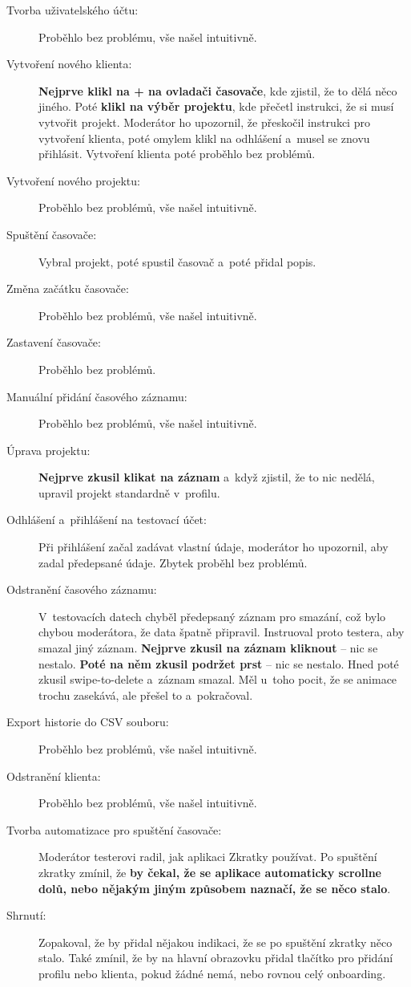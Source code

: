 \begin{description}
\item[Tvorba uživatelského účtu:] Proběhlo bez problému, vše našel intuitivně.
\item[Vytvoření nového klienta:] \textbf{Nejprve klikl na + na ovladači časovače}, kde zjistil, že to dělá něco jiného. Poté \textbf{klikl na výběr projektu}, kde přečetl instrukci, že si musí vytvořit projekt. Moderátor ho upozornil, že přeskočil instrukci pro vytvoření klienta, poté omylem klikl na odhlášení a~musel se znovu přihlásit. Vytvoření klienta poté proběhlo bez problémů.
\item[Vytvoření nového projektu:] Proběhlo bez problémů, vše našel intuitivně.
\item[Spuštění časovače:] Vybral projekt, poté spustil časovač a~poté přidal popis.
\item[Změna začátku časovače:] Proběhlo bez problémů, vše našel intuitivně.
\item[Zastavení časovače:] Proběhlo bez problémů.
\item[Manuální přidání časového záznamu:] Proběhlo bez problémů, vše našel intuitivně.
\item[Úprava projektu:] \textbf{Nejprve zkusil klikat na záznam} a~když zjistil, že to nic nedělá, upravil projekt standardně v~profilu.
\item[Odhlášení a~přihlášení na testovací účet:] Při přihlášení začal zadávat vlastní údaje, moderátor ho upozornil, aby zadal předepsané údaje. Zbytek proběhl bez problémů.
\item[Odstranění časového záznamu:] V~testovacích datech chyběl předepsaný záznam pro smazání, což bylo chybou moderátora, že data špatně připravil. Instruoval proto testera, aby smazal jiný záznam. \textbf{Nejprve zkusil na záznam kliknout} – nic se nestalo. \textbf{Poté na něm zkusil podržet prst} – nic se nestalo. Hned poté zkusil swipe-to-delete a~záznam smazal. Měl u~toho pocit, že se animace trochu zasekává, ale přešel to a~pokračoval.
\item[Export historie do CSV souboru:] Proběhlo bez problémů, vše našel intuitivně.
\item[Odstranění klienta:] Proběhlo bez problémů, vše našel intuitivně.
\item[Tvorba automatizace pro spuštění časovače:] Moderátor testerovi radil, jak aplikaci Zkratky používat. Po spuštění zkratky zmínil, že \textbf{by čekal, že se aplikace automaticky scrollne dolů, nebo nějakým jiným způsobem naznačí, že se něco stalo}.
\item[Shrnutí:] Zopakoval, že by přidal nějakou indikaci, že se po spuštění zkratky něco stalo. Také zmínil, že by na hlavní obrazovku přidal tlačítko pro přidání profilu nebo klienta, pokud žádné nemá, nebo rovnou celý onboarding.
\end{description}


